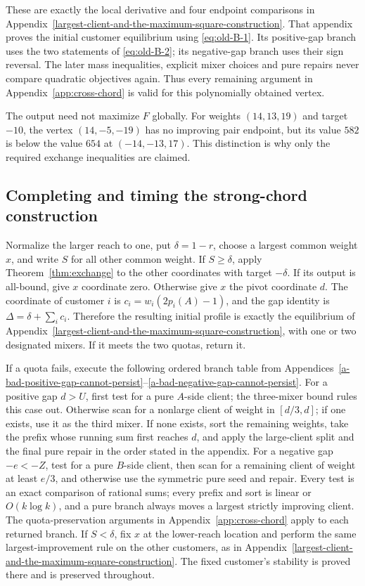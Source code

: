 \documentclass[11pt]{amsart}
\numberwithin{equation}{section}
\theoremstyle{definition}
\begin{document}
These are exactly the local derivative and four endpoint comparisons in
Appendix~\ref{largest-client-and-the-maximum-square-construction}. That appendix proves the initial customer equilibrium using
\eqref{eq:old-B-1}. Its positive-gap branch uses the two statements of \eqref{eq:old-B-2}; its
negative-gap branch uses their sign reversal. The later mass inequalities,
explicit mixer choices and pure repairs never compare quadratic objectives
again. Thus every remaining argument in Appendix~\ref{app:cross-chord} is valid for this
polynomially obtained vertex.

The output need not maximize $F$ globally. For weights $(14,13,19)$ and
target $-10$, the vertex $(14,-5,-19)$ has no improving pair endpoint,
but its value $582$ is below the value $654$ at $(-14,-13,17)$.
This distinction is why only the required exchange inequalities are claimed.

\subsection{Completing and timing the strong-chord construction}
Normalize the larger reach to one, put $\delta=1-r$, choose a largest
common weight $x$, and write $S$ for all other common weight. If
$S\ge\delta$, apply Theorem~\ref{thm:exchange} to the other coordinates
with target $-\delta$. If its output is all-bound, give $x$ coordinate
zero. Otherwise give $x$ the pivot coordinate $d$. The coordinate of
customer $i$ is $c_i=w_i(2p_i(A)-1)$, and the gap identity is
$\Delta=\delta+\sum_i c_i$. Therefore the resulting initial profile is
exactly the equilibrium of Appendix~\ref{largest-client-and-the-maximum-square-construction}, with one or two designated
mixers. If it meets the two quotas, return it.

If a quota fails, execute the following ordered branch table from Appendices~\ref{a-bad-positive-gap-cannot-persist}--\ref{a-bad-negative-gap-cannot-persist}. For a positive gap \(d>U\), first test for a pure \(A\)-side client; the three-mixer bound rules this case out. Otherwise scan for a nonlarge client of weight in \([d/3,d]\); if one exists, use it as the third mixer. If none exists, sort the remaining weights, take the prefix whose running sum first reaches \(d\), and apply the large-client split and the final pure repair in the order stated in the appendix. For a negative gap \(-e<-Z\), test for a pure \(B\)-side client, then scan for a remaining client of weight at least \(e/3\), and otherwise use the symmetric pure seed and repair. Every test is an exact comparison of rational sums; every prefix and sort is linear or \(O(k\log k)\), and a pure branch always moves a largest strictly improving client. The quota-preservation arguments in Appendix~\ref{app:cross-chord} apply to each returned branch.
If $S<\delta$, fix $x$ at the lower-reach location and perform the same
largest-improvement rule on the other customers, as in Appendix~\ref{largest-client-and-the-maximum-square-construction}.
The fixed customer's stability is proved there and is preserved throughout.
\end{document}
